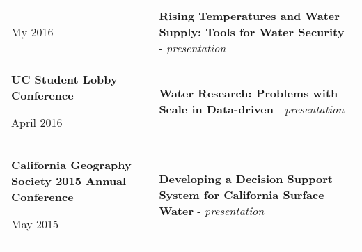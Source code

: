 \begin{longtable}[]{@{}ll@{}}
\begin{minipage}[t]{0.47\columnwidth}
My 2016\strut
\end{minipage} & \begin{minipage}[t]{0.47\columnwidth}\raggedright
\textbf{Rising Temperatures and Water Supply: Tools for Water Security}
- \emph{presentation}\strut
\end{minipage}\tabularnewline
\begin{minipage}[t]{0.47\columnwidth}\raggedright
\textbf{UC Student Lobby Conference }

April 2016\strut
\end{minipage} & \begin{minipage}[t]{0.47\columnwidth}\raggedright
\textbf{Water Research: Problems with Scale in Data-driven} -
\emph{presentation}\strut
\end{minipage}\tabularnewline
\begin{minipage}[t]{0.47\columnwidth}\raggedright
\textbf{California Geography Society 2015 Annual Conference}

May 2015\strut
\end{minipage} & \begin{minipage}[t]{0.47\columnwidth}\raggedright
\textbf{Developing a Decision Support System for California Surface
Water} - \emph{presentation}\strut
\end{minipage}\tabularnewline
\bottomrule
\end{longtable}

